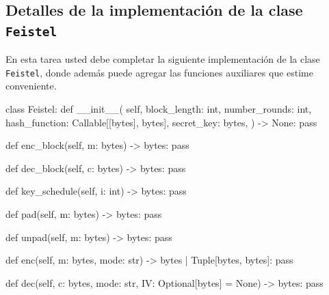 \subsection*{Detalles de la implementación de la clase \texttt{Feistel}}
En esta tarea usted debe completar la siguiente implementación de la clase \texttt{Feistel}, donde además puede agregar las funciones auxiliares que estime conveniente.

\begin{python}
class Feistel:
    def __init__(
        self,
        block_length: int,
        number_rounds: int,
        hash_function: Callable[[bytes], bytes],
        secret_key: bytes,
    ) -> None:
        pass

    def enc_block(self, m: bytes) -> bytes:
        pass

    def dec_block(self, c: bytes) -> bytes:
        pass

    def key_schedule(self, i: int) -> bytes:
        pass

    def pad(self, m: bytes) -> bytes:
        pass

    def unpad(self, m: bytes) -> bytes:
        pass

    def enc(self, m: bytes, mode: str) -> bytes | Tuple[bytes, bytes]:
        pass

    def dec(self, c: bytes, mode: str, IV: Optional[bytes] = None) -> bytes:
        pass
\end{python}


